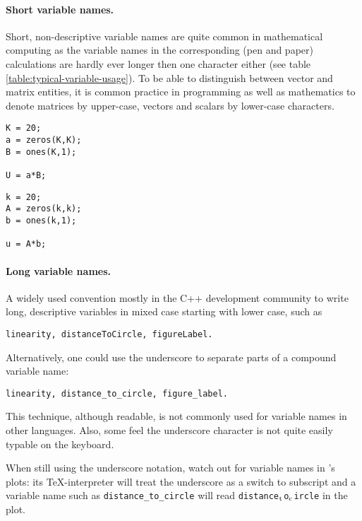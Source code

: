 \paragraph{Short variable names.}
Short, non-descriptive variable names are quite common in mathematical computing as the variable names in the corresponding (pen and paper) calculations are hardly ever longer then one character either (see table \ref{table:typical-variable-usage}). To be able to distinguish between vector and matrix entities, it is common practice in programming as well as mathematics to denote matrices by upper-case, vectors and scalars by lower-case characters.

\hfill
\begin{minipage}[t]{.45\textwidth}
\begin{lstlisting}[framerule=2pt,rulecolor=\color{badred}]
K = 20;
a = zeros(K,K);
B = ones(K,1);

U = a*B;
\end{lstlisting}
\end{minipage}
\hfill
\begin{minipage}[t]{.45\textwidth}
\begin{lstlisting}[framerule=2pt,rulecolor=\color{goodgreen}]
k = 20;
A = zeros(k,k);
b = ones(k,1);

u = A*b;
\end{lstlisting}
\end{minipage}
\hfill


\paragraph{Long variable names.}
A widely used convention mostly in the C++ development community to write long, descriptive variables in mixed case starting with lower case, such as
\begin{lstlisting}
linearity, distanceToCircle, figureLabel.
\end{lstlisting}
Alternatively, one could use the underscore to separate parts of a compound variable name:
\begin{lstlisting}
linearity, distance_to_circle, figure_label.
\end{lstlisting}
This technique, although readable, is not commonly used for variable names in other languages. Also, some feel the underscore character is not quite easily typable on the keyboard.

When still using the underscore notation, watch out for variable names in \matlab{}'s plots: its \TeX-interpreter will treat the underscore as a switch to subscript and a variable name such as \lstinline!distance_to_circle! will read \lstinline!distance!$_{\text{\lstinline!t!}}$\lstinline!o!$_{\text{\lstinline!c!}}$\lstinline!ircle! in the plot.

